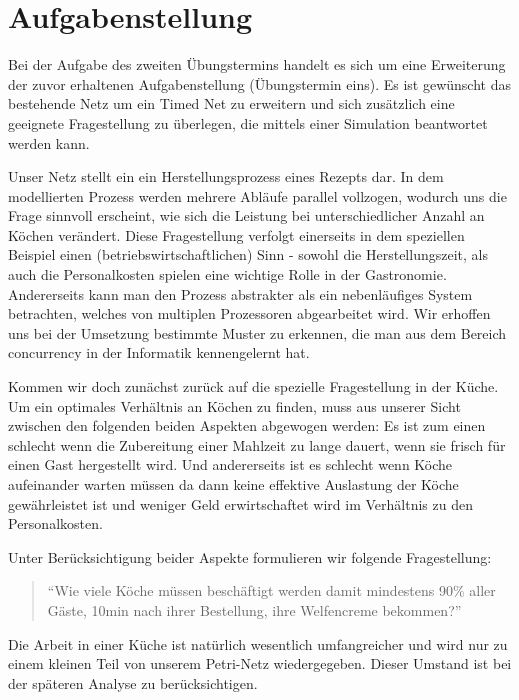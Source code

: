 \section*{Aufgabenstellung} %
\label{sec:aufgabenstellung}
Bei der Aufgabe des zweiten Übungstermins handelt es sich um eine Erweiterung der zuvor erhaltenen Aufgabenstellung (Übungstermin eins). Es ist gewünscht das bestehende Netz um ein Timed Net zu erweitern und sich zusätzlich eine geeignete Fragestellung zu überlegen, die mittels einer Simulation beantwortet werden kann.

Unser Netz stellt ein ein Herstellungsprozess eines Rezepts dar. In dem modellierten Prozess werden mehrere Abläufe parallel vollzogen, wodurch uns die Frage sinnvoll erscheint, wie sich die Leistung bei unterschiedlicher Anzahl an Köchen verändert. Diese Fragestellung verfolgt einerseits in dem speziellen Beispiel einen (betriebswirtschaftlichen) Sinn - sowohl die Herstellungszeit, als auch die Personalkosten spielen eine wichtige Rolle in der Gastronomie. Andererseits kann man den Prozess abstrakter als ein nebenläufiges System betrachten, welches von multiplen Prozessoren abgearbeitet wird. Wir erhoffen uns bei der Umsetzung bestimmte Muster zu erkennen, die man aus dem Bereich concurrency in der Informatik kennengelernt hat.

Kommen wir doch zunächst zurück auf die spezielle Fragestellung in der Küche. Um ein optimales Verhältnis an Köchen zu finden, muss aus unserer Sicht zwischen den folgenden beiden Aspekten abgewogen werden: Es ist zum einen schlecht wenn die Zubereitung einer Mahlzeit zu lange dauert, wenn sie frisch für einen Gast hergestellt wird. Und andererseits ist es schlecht wenn Köche aufeinander warten müssen da dann keine effektive Auslastung der Köche gewährleistet ist und weniger Geld erwirtschaftet wird im Verhältnis zu den Personalkosten.

Unter Berücksichtigung beider Aspekte formulieren wir folgende Fragestellung:

\begin{quote}
\begin{tt}
\begin{center}
``Wie viele Köche müssen beschäftigt werden damit mindestens 90\% aller Gäste, 10min nach ihrer Bestellung, ihre Welfencreme bekommen?''
\end{center}
\end{tt}
\end{quote}
Die Arbeit in einer Küche ist natürlich wesentlich umfangreicher und wird nur zu einem kleinen Teil von unserem Petri-Netz wiedergegeben. Dieser Umstand ist bei der späteren Analyse zu berücksichtigen.
